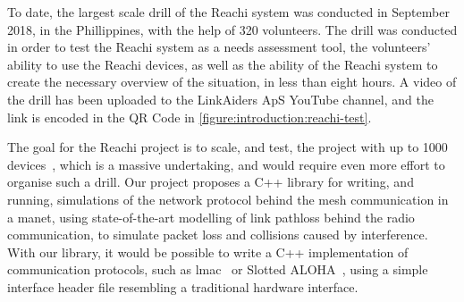 To date, the largest scale drill of the Reachi system was conducted in September 2018, in the Phillippines, with the help of 320 volunteers. The drill was conducted in order to test the Reachi system as a needs assessment tool, the volunteers' ability to use the Reachi devices, as well as the ability of the Reachi system to create the necessary overview of the situation, in less than eight hours. A video of the drill has been uploaded to the LinkAiders ApS YouTube channel, and the link is encoded in the QR Code in \autoref{figure:introduction:reachi-test}. \medbreak

The goal for the Reachi project is to scale, and test, the project with up to 1000 devices~\cite{website:reachiproject}, which is a massive undertaking, and would require even more effort to organise such a drill. Our project proposes a C++ library for writing, and running, simulations of the network protocol behind the mesh communication in a \gls{manet}, using state-of-the-art modelling of link \gls{pathloss} behind the radio communication, to simulate packet loss and collisions caused by interference. With our library, it would be possible to write a C++ implementation of communication protocols, such as \gls{lmac}~\cite{paper:lmac_protocol} or Slotted ALOHA~\cite{Roberts:1975:APS:1024916.1024920}, using a simple interface header file resembling a traditional hardware interface.







